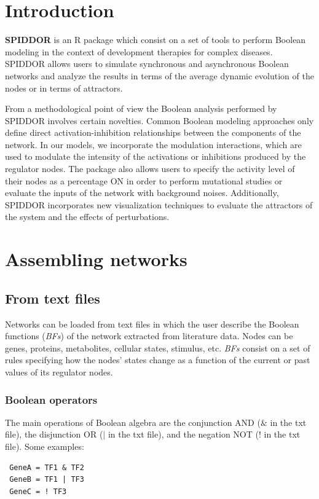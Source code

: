 \documentclass[a4paper]{article}
\begin{document}
\section{Introduction}
\textbf{SPIDDOR }is an R package which consist on a set of tools to perform Boolean modeling in the context of development therapies for complex diseases. SPIDDOR allows users to simulate synchronous and asynchronous Boolean networks and analyze the results in terms of the average dynamic evolution of the nodes or in terms of attractors.

From a methodological point of view the Boolean analysis performed by SPIDDOR involves certain novelties. Common Boolean modeling approaches only define direct activation-inhibition relationships between the components of the network. In our models, we incorporate the modulation interactions, which are used to modulate the intensity of the activations or inhibitions produced by the regulator nodes. The package also allows users to specify the activity level of their nodes as a percentage ON in order to perform mutational studies or evaluate the inputs of the network with background noises. Additionally, SPIDDOR incorporates new visualization techniques to evaluate the attractors of the system and the effects of perturbations.

\section{Assembling networks}

\subsection{From text files}
Networks can be loaded from text files in which the user describe the Boolean functions (\emph{BFs}) of the network extracted from literature data. Nodes can be genes, proteins, metabolites, cellular states, stimulus, etc. \emph{BFs} consist on a set of rules specifying how the nodes' states change as a function of the current or past values of its regulator nodes. 

\subsubsection{Boolean operators}
The main operations of Boolean algebra are the conjunction AND ($\&$ in the txt file), the disjunction OR ($|$ in the txt file), and the negation NOT ($!$ in the txt file). Some examples:
 \begin{verbatim}
 GeneA = TF1 & TF2
 GeneB = TF1 | TF3
 GeneC = ! TF3
 \end{verbatim}
\end{document}
